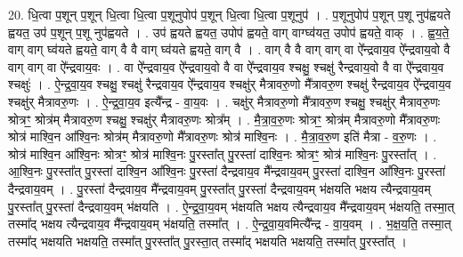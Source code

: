 \documentclass[17pt]{extarticle}
\begin{document}
20. धि॒त्वा प॒शून् प॒शून् धि॒त्वा धि॒त्वा प॒शूनुपोप॑ प॒शून् धि॒त्वा धि॒त्वा प॒शूनुप॑ । . प॒शूनुपोप॑ प॒शून् प॒शू नुप॑ह्वयते ह्वयत॒ उप॑ प॒शून् प॒शू नुप॑ह्वयते । . उप॑ ह्वयते ह्वयत॒ उपोप॑ ह्वयते॒ वाग् वाग्घ्व॑यत॒ उपोप॑ ह्वयते॒ वाक् । . ह्व॒य॒ते॒ वाग् वाग् घ्व॑यते ह्वयते॒ वाग् वै वै वाग् घ्व॑यते ह्वयते॒ वाग् वै । . वाग् वै वै वाग् वाग् वा ऐ᳚न्द्रवाय॒व ऐ᳚न्द्रवाय॒वो वै वाग् वाग् वा ऐ᳚न्द्रवाय॒वः । . वा ऐ᳚न्द्रवाय॒व ऐ᳚न्द्रवाय॒वो वै वा ऐ᳚न्द्रवाय॒व श्चक्षु॒ श्चक्षु॑ रैन्द्रवाय॒वो वै वा ऐ᳚न्द्रवाय॒व श्चक्षुः॑ । . ऐ॒न्द्र॒वा॒य॒व श्चक्षु॒ श्चक्षु॑ रैन्द्रवाय॒व ऐ᳚न्द्रवाय॒व श्चक्षु॑र् मैत्रावरु॒णो मै᳚त्रावरु॒ण श्चक्षु॑ रैन्द्रवाय॒व ऐ᳚न्द्रवाय॒व श्चक्षु॑र् मैत्रावरु॒णः । . ऐ॒न्द्र॒वा॒य॒व इत्यै᳚न्द्र - वा॒य॒वः । . चक्षु॑र् मैत्रावरु॒णो मै᳚त्रावरु॒ण श्चक्षु॒ श्चक्षु॑र् मैत्रावरु॒णः श्रोत्रꣳ॒॒ श्रोत्र॑म् मैत्रावरु॒ण श्चक्षु॒ श्चक्षु॑र् मैत्रावरु॒णः श्रोत्र᳚म् । . मै॒त्रा॒व॒रु॒णः श्रोत्रꣳ॒॒ श्रोत्र॑म् मैत्रावरु॒णो मै᳚त्रावरु॒णः श्रोत्र॑ माश्वि॒न आ᳚श्वि॒नः श्रोत्र॑म् मैत्रावरु॒णो मै᳚त्रावरु॒णः श्रोत्र॑ माश्वि॒नः । . मै॒त्रा॒व॒रु॒ण इति॑ मैत्रा - व॒रु॒णः । . श्रोत्र॑ माश्वि॒न आ᳚श्वि॒नः श्रोत्रꣳ॒॒ श्रोत्र॑ माश्वि॒नः पु॒रस्ता᳚त् पु॒रस्ता॑ दाश्वि॒नः श्रोत्रꣳ॒॒ श्रोत्र॑ माश्वि॒नः पु॒रस्ता᳚त् । . आ॒श्वि॒नः पु॒रस्ता᳚त् पु॒रस्ता॑ दाश्वि॒न आ᳚श्वि॒नः पु॒रस्ता॑ दैन्द्रवाय॒व मै᳚न्द्रवाय॒वम् पु॒रस्ता॑ दाश्वि॒न आ᳚श्वि॒नः पु॒रस्ता॑ दैन्द्रवाय॒वम् । . पु॒रस्ता॑ दैन्द्रवाय॒व मै᳚न्द्रवाय॒वम् पु॒रस्ता᳚त् पु॒रस्ता॑ दैन्द्रवाय॒वम् भ॑क्षयति भक्षय त्यैन्द्रवाय॒वम् पु॒रस्ता᳚त् पु॒रस्ता॑ दैन्द्रवाय॒वम् भ॑क्षयति । . ऐ॒न्द्र॒वा॒य॒वम् भ॑क्षयति भक्षय त्यैन्द्रवाय॒व मै᳚न्द्रवाय॒वम् भ॑क्षयति॒ तस्मा॒त् तस्मा᳚द् भक्षय त्यैन्द्रवाय॒व मै᳚न्द्रवाय॒वम् भ॑क्षयति॒ तस्मा᳚त् । . ऐ॒न्द्र॒वा॒य॒वमित्यै᳚न्द्र - वा॒य॒वम् । . भ॒क्ष॒य॒ति॒ तस्मा॒त् तस्मा᳚द् भक्षयति भक्षयति॒ तस्मा᳚त् पु॒रस्ता᳚त् पु॒रस्ता॒त् तस्मा᳚द् भक्षयति भक्षयति॒ तस्मा᳚त् पु॒रस्ता᳚त् । \newline
\end{document}
